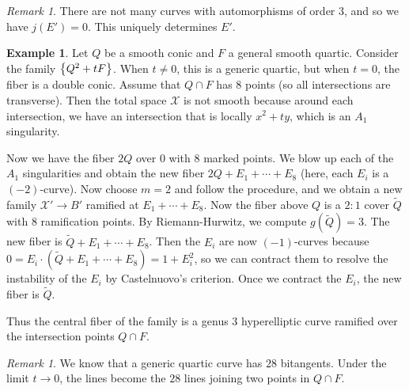 \documentclass[leqno, openany]{memoir}
\theoremstyle{definition}
\newtheorem{exm}[thm]{Example}
\theoremstyle{remark}
\newtheorem{rmk}[thm]{Remark}
\theoremstyle{plain}
\theoremstyle{definition}
\theoremstyle{remark}
\newcommand{\mc}[1]{\mathcal{#1}}
\newcommand{\wt}[1]{\widetilde{#1}}
\begin{document}
\begin{rmk} There are not many curves with automorphisms of order $3$, and so
we have $j(E') = 0$. This uniquely determines $E'$.  \end{rmk}

\begin{exm} Let $Q$ be a smooth conic and $F$ a general smooth quartic.
    Consider the family $\qty{Q^2 + tF}$. When $t \neq 0$, this is a generic
    quartic, but when $t = 0$, the fiber is a double conic. Assume that $Q \cap
    F$ has $8$ points (so all intersections are transverse). Then the total
    space $\mc{X}$ is not smooth because around each intersection, we have an
    intersection that is locally $x^2 + ty$, which is an $A_1$ singularity. 

    Now we have the fiber $2Q$ over $0$ with $8$ marked points. We blow up each
    of the $A_1$ singularities and obtain the new fiber $2Q + E_1 + \cdots +
    E_8$ (here, each $E_i$ is a $(-2)$-curve). Now choose $m = 2$ and follow
    the procedure, and we obtain a new family $\mc{X}' \to B'$ ramified at $E_1
    + \cdots + E_8$. Now the fiber above $Q$ is a $2:1$ cover $\wt{Q}$ with $8$
    ramification points. By Riemann-Hurwitz, we compute $g(\wt{Q}) = 3$. The
    new fiber is $\wt{Q} + E_1 + \cdots + E_8$. Then the $E_i$ are now
    $(-1)$-curves because $0 = E_i \cdot (\wt{Q} + E_1 + \cdots + E_8) = 1 +
    E_i^2$, so we can contract them to resolve the instability of the $E_i$ by
    Castelnuovo's criterion. Once we contract the $E_i$, the new fiber is
    $\wt{Q}$.

    Thus the central fiber of the family is a genus $3$ hyperelliptic curve
ramified over the intersection points $Q \cap F$.  \end{exm}

\begin{rmk} We know that a generic quartic curve has $28$ bitangents. Under the
limit $t \to 0$, the lines become the $28$ lines joining two points in $Q \cap
F$.  \end{rmk}
\end{document}
